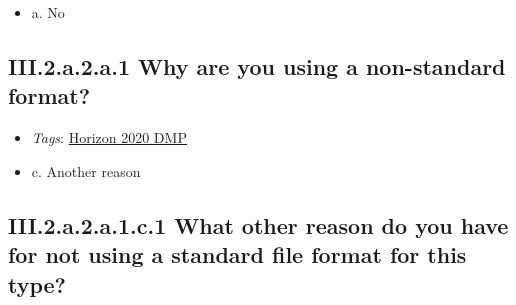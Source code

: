 \documentclass[a4paper,12pt]{report}
\begin{document}
\begin{itemize}
  \item[\CheckmarkBold] a. No
\end{itemize}




\subsection*{\protect\textcolor{colorSecId}{III.2.a.2.a.1} Why are you using a non-standard format?}

\label{b1df3c74-0b1f-4574-81c4-4cc2d780c1af.b08fe063-33f8-4380-b3a9-ba1e586dedf2.df7ff410-748e-4704-b5b4-a06c4b269047.ecff019a-d4e6-44c6-a8fe-c84eb15ed8b7.52b7aba3-d809-4a30-b3f8-90caa7a32a10.8bd3d76a-4f69-4a1e-82dd-5416739720b3}


\begin{itemize}
  \item \textit{Tags}: \ul{Horizon 2020 DMP}
  \end{itemize}




\begin{itemize}
  \item[\CheckmarkBold] c. Another reason
\end{itemize}




\subsection*{\protect\textcolor{colorSecId}{III.2.a.2.a.1.c.1} What other reason do you have for not using a standard file format for this type?}

\label{b1df3c74-0b1f-4574-81c4-4cc2d780c1af.b08fe063-33f8-4380-b3a9-ba1e586dedf2.df7ff410-748e-4704-b5b4-a06c4b269047.ecff019a-d4e6-44c6-a8fe-c84eb15ed8b7.52b7aba3-d809-4a30-b3f8-90caa7a32a10.8bd3d76a-4f69-4a1e-82dd-5416739720b3.ab19f42e-6204-409e-aa6d-6d87783cce44.ea7420ef-3de3-4ca8-9ff8-ac1cdb0e506f}
\end{document}
